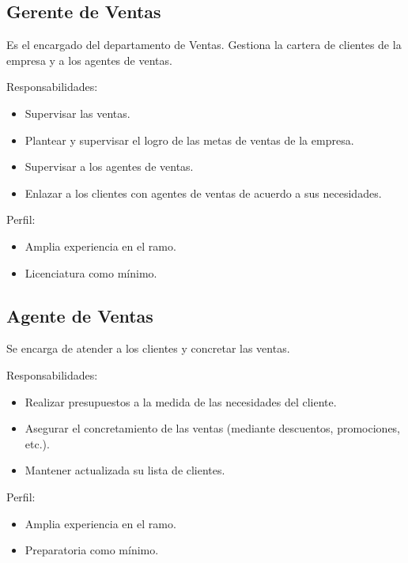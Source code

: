 \begin{Usuario}{\hypertarget{gerenteVentas}{\subsection{Gerente de Ventas}}}{
	Es el encargado del departamento de Ventas. Gestiona la cartera de clientes de la empresa y a los agentes de ventas.
}
    \item[Responsabilidades:] \cdtEmpty
    \begin{itemize}
		\item Supervisar las ventas.
		\item Plantear y supervisar el logro de las metas de ventas de la empresa.
		\item Supervisar a los agentes de ventas.
		\item Enlazar a los clientes con agentes de ventas de acuerdo a sus necesidades.
    \end{itemize}

	\item[Perfil:] \cdtEmpty
    \begin{itemize}
		\item Amplia experiencia en el ramo.
		\item Licenciatura como mínimo.
    \end{itemize}
\end{Usuario}

\begin{Usuario}{\hypertarget{agenteVentas}{\subsection{Agente de Ventas}}}{
	Se encarga de atender a los clientes y concretar las ventas.
}
    \item[Responsabilidades:] \cdtEmpty
    \begin{itemize}
		\item Realizar presupuestos a la medida de las necesidades del cliente.
		\item Asegurar el concretamiento de las ventas (mediante descuentos, promociones, etc.).
		\item Mantener actualizada su lista de clientes.
    \end{itemize}

	\item[Perfil:] \cdtEmpty
    \begin{itemize}
		\item Amplia experiencia en el ramo.
		\item Preparatoria como mínimo.
    \end{itemize}
\end{Usuario}

